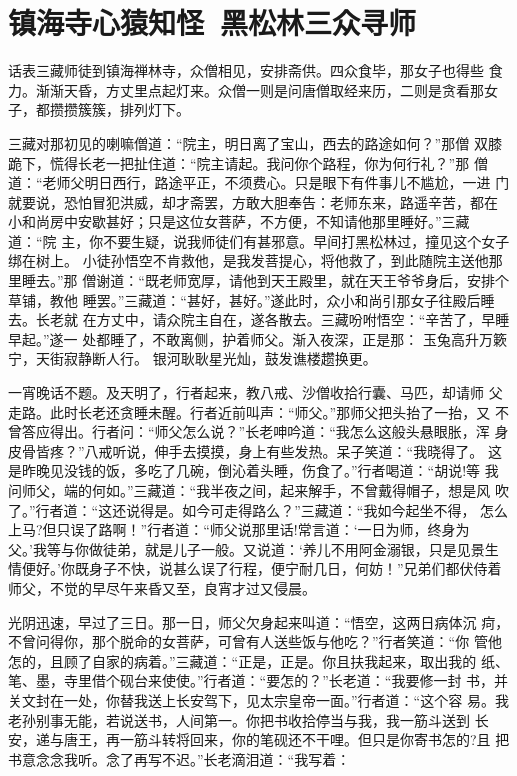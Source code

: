 \chapter{镇海寺心猿知怪~黑松林三众寻师}

话表三藏师徒到镇海禅林寺，众僧相见，安排斋供。四众食毕，那女子也得些
食力。渐渐天昏，方丈里点起灯来。众僧一则是问唐僧取经来历，二则是贪看那女
子，都攒攒簇簇，排列灯下。

三藏对那初见的喇嘛僧道：“院主，明日离了宝山，西去的路途如何？”那僧
双膝跪下，慌得长老一把扯住道：“院主请起。我问你个路程，你为何行礼？”那
僧道：“老师父明日西行，路途平正，不须费心。只是眼下有件事儿不尴尬，一进
门就要说，恐怕冒犯洪威，却才斋罢，方敢大胆奉告：老师东来，路遥辛苦，都在
小和尚房中安歇甚好；只是这位女菩萨，不方便，不知请他那里睡好。”三藏道：“院
主，你不要生疑，说我师徒们有甚邪意。早间打黑松林过，撞见这个女子绑在树上。
小徒孙悟空不肯救他，是我发菩提心，将他救了，到此随院主送他那里睡去。”那
僧谢道：“既老师宽厚，请他到天王殿里，就在天王爷爷身后，安排个草铺，教他
睡罢。”三藏道：“甚好，甚好。”遂此时，众小和尚引那女子往殿后睡去。长老就
在方丈中，请众院主自在，遂各散去。三藏吩咐悟空：“辛苦了，早睡早起。”遂一
处都睡了，不敢离侧，护着师父。渐入夜深，正是那：
玉兔高升万簌宁，天街寂静断人行。
银河耿耿星光灿，鼓发谯楼趱换更。

一宵晚话不题。及天明了，行者起来，教八戒、沙僧收拾行囊、马匹，却请师
父走路。此时长老还贪睡未醒。行者近前叫声：“师父。”那师父把头抬了一抬，又
不曾答应得出。行者问：“师父怎么说？”长老呻吟道：“我怎么这般头悬眼胀，浑
身皮骨皆疼？”八戒听说，伸手去摸摸，身上有些发热。呆子笑道：“我晓得了。
这是昨晚见没钱的饭，多吃了几碗，倒沁着头睡，伤食了。”行者喝道：“胡说!等
我问师父，端的何如。”三藏道：“我半夜之间，起来解手，不曾戴得帽子，想是风
吹了。”行者道：“这还说得是。如今可走得路么？”三藏道：“我如今起坐不得，
怎么上马?但只误了路啊！”行者道：“师父说那里话!常言道：‘一日为师，终身为
父。’我等与你做徒弟，就是儿子一般。又说道：‘养儿不用阿金溺银，只是见景生
情便好。’你既身子不快，说甚么误了行程，便宁耐几日，何妨！”兄弟们都伏侍着
师父，不觉的早尽午来昏又至，良宵才过又侵晨。

光阴迅速，早过了三日。那一日，师父欠身起来叫道：“悟空，这两日病体沉
疴，不曾问得你，那个脱命的女菩萨，可曾有人送些饭与他吃？”行者笑道：“你
管他怎的，且顾了自家的病着。”三藏道：“正是，正是。你且扶我起来，取出我的
纸、笔、墨，寺里借个砚台来使使。”行者道：“要怎的？”长老道：“我要修一封
书，并关文封在一处，你替我送上长安驾下，见太宗皇帝一面。”行者道：“这个容
易。我老孙别事无能，若说送书，人间第一。你把书收拾停当与我，我一筋斗送到
长安，递与唐王，再一筋斗转将回来，你的笔砚还不干哩。但只是你寄书怎的?且
把书意念念我听。念了再写不迟。”长老滴泪道：“我写着：

